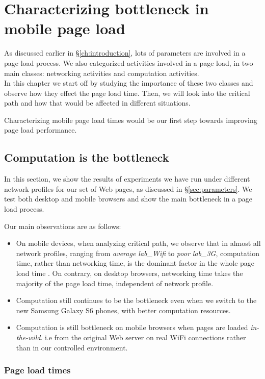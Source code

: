 \chapter{Characterizing bottleneck in mobile page load}\label{ch:bottleneck}
As discussed earlier in \S\ref{ch:introduction}, lots of parameters are involved in a page load process.
We also categorized activities involved in a page load, in two main classes: networking activities and computation activities.\\
In this chapter we start off by studying the importance of these two classes and observe how they effect the page load time.
Then, we will look into the critical path and how that would be affected in different situations.

\noindent Characterizing mobile page load times would be our first step towards improving page load performance.

\section{Computation is the bottleneck}

In this section, we show the results of experiments we have run under different network profiles for our set of Web pages, as discussed in \S\ref{sec:parameters}.
We test both desktop and mobile browsers and show the main bottleneck in a page load process.

Our main observations are as follows: 
\begin{itemize}
\item On mobile devices, when analyzing critical path, we observe that in almost all network profiles, ranging from  {\em average lab\_Wifi} to {\em poor lab\_3G}, computation time, rather than networking time, is the dominant factor in the whole page load time .
On contrary, on desktop browsers, networking time takes the majority of the page load time, independent of network profile.
\item Computation still continues to be the bottleneck even when we switch to the new Samsung Galaxy S6 phones, with better computation resources.

\item Computation is still bottleneck on mobile browsers when pages are loaded {\em in-the-wild}. i.e from the original Web server on real WiFi connections rather than in our controlled environment. 
\end{itemize}

\subsection{Page load times}

